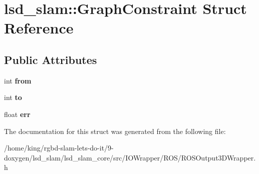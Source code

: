 \hypertarget{structlsd__slam_1_1_graph_constraint}{\section{lsd\-\_\-slam\-:\-:Graph\-Constraint Struct Reference}
\label{structlsd__slam_1_1_graph_constraint}
}
\subsection*{Public Attributes}
\begin{DoxyCompactItemize}
\item 
\hypertarget{structlsd__slam_1_1_graph_constraint_a80e3d573d81057ca656928db32230309}{int {\bfseries from}}\label{structlsd__slam_1_1_graph_constraint_a80e3d573d81057ca656928db32230309}

\item 
\hypertarget{structlsd__slam_1_1_graph_constraint_ac8ae6688390a68126e23b25fd505eeef}{int {\bfseries to}}\label{structlsd__slam_1_1_graph_constraint_ac8ae6688390a68126e23b25fd505eeef}

\item 
\hypertarget{structlsd__slam_1_1_graph_constraint_a1f4dc0d25efc0b7c1cc63c7d2b7cf77e}{float {\bfseries err}}\label{structlsd__slam_1_1_graph_constraint_a1f4dc0d25efc0b7c1cc63c7d2b7cf77e}

\end{DoxyCompactItemize}


The documentation for this struct was generated from the following file\-:\begin{DoxyCompactItemize}
\item 
/home/king/rgbd-\/slam-\/lets-\/do-\/it/9-\/doxygen/lsd\-\_\-slam/lsd\-\_\-slam\-\_\-core/src/\-I\-O\-Wrapper/\-R\-O\-S/R\-O\-S\-Output3\-D\-Wrapper.\-h\end{DoxyCompactItemize}
